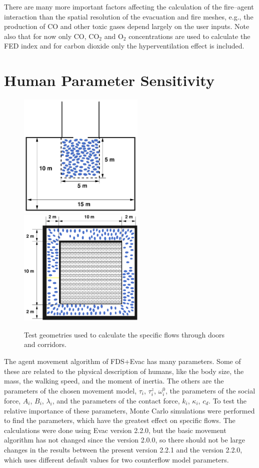 \documentclass[12pt,a4paper,final,twoside]{stylevk}
\begin{document}
There are many more important factors affecting the calculation of the
fire--agent interaction than the spatial resolution of the evacuation
and fire meshes, e.g., the production of CO and other toxic
gases depend largely on the user inputs.  Note also that for now only
CO, CO${}_2$ and O${}_2$ concentrations are used to calculate the FED
index and for carbon dioxide only the hyperventilation effect is
included.


\section{Human Parameter Sensitivity}\label{Sec_HumParSensi}

%
\begin{figure}[!tb]
  \centerline{ \includegraphics[clip=true,
    width=60mm]{FIGURES/Door_Geom} ~~~~~~~~   
    \includegraphics[clip=true,width=60mm]{FIGURES/CorrGeom2} }
  \caption{Test geometries used to calculate the specific flows through
    doors and corridors.\protect\hspace{200mm}}\label{Fig_Geoms}
\end{figure}
%

\noindent The agent movement algorithm of FDS+Evac has many
parameters.  Some of these are related to the physical description of
humans, like the body size, the mass, the walking speed, and the
moment of inertia.  The others are the parameters of the chosen
movement model, $\tau_i$, $\tau^z_i$, $\omega^0_i$, the parameters of
the social force, $A_i$, $B_i$, $\lambda_i$, and the parameters of the
contact force, $k_i$, $\kappa_i$, $c_d$.  To test the relative
importance of these parameters, Monte Carlo simulations were performed
to find the parameters, which have the greatest effect on specific
flows.  The calculations were done using Evac version 2.2.0, but the
basic movement algorithm has not changed since the version 2.0.0, so
there should not be large changes in the results between the present
version 2.2.1 and the version 2.2.0, which uses different default
values for two counterflow model parameters.
\end{document}
